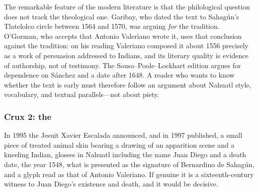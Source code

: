 The remarkable feature of the modern literature is that the
philological question does not track the theological one. Garibay,
who dated the text to Sahag\'un's Tlatelolco circle between 1564 and
1570, was arguing \emph{for} the tradition. O'Gorman, who accepts
that Antonio Valeriano wrote it, uses that conclusion against the
tradition: on his reading Valeriano composed it about 1556 precisely
as a work of persuasion addressed to Indians, and its literary
quality is evidence of authorship, not of testimony. The
Sousa--Poole--Lockhart edition argues for dependence on S\'anchez and
a date after 1648. A reader who wants to know whether the text is
early must therefore follow an argument about Nahuatl style,
vocabulary, and textual parallels---not about
piety.

\subsubsection*{Crux 2: the }

In 1995 the Jesuit Xavier Escalada announced, and in 1997 published,
a small piece of treated animal skin bearing a drawing of an apparition
scene and a kneeling Indian, glosses in Nahuatl including the name
Juan Diego and a death date, the year 1548, what is presented as the
signature of Bernardino de Sahag\'un, and a glyph read as that of
Antonio Valeriano. If genuine it is a sixteenth-century witness to
Juan Diego's existence and death, and it would be decisive.

